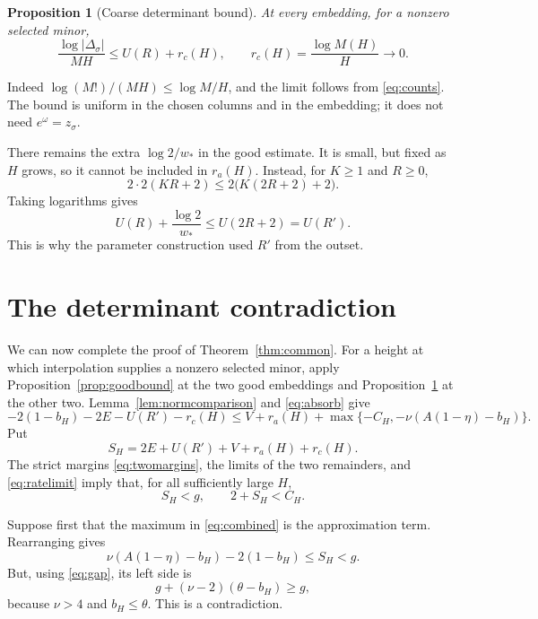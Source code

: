 \documentclass[11pt]{article}
\newtheorem{proposition}[theorem]{Proposition}
\theoremstyle{definition}
\theoremstyle{remark}
\theoremstyle{plain}
\begin{document}
\begin{proposition}[Coarse determinant bound]\label{prop:coarse}
At every embedding, for a nonzero selected minor,
\begin{equation}\label{eq:coarse}
 \frac{\log|\Delta_\sigma|}{MH}
 \le U(R)+r_c(H),\qquad r_c(H)=\frac{\log M(H)}H\longrightarrow0.
\end{equation}
\end{proposition}
Indeed \(\log(M!)/(MH)\le\log M/H\), and the limit follows from
\eqref{eq:counts}. The bound is uniform in the chosen columns and in the
embedding; it does not need \(e^\omega=z_\sigma\).

There remains the extra \(\log2/w_*\) in the good estimate. It is
small, but fixed as \(H\) grows, so it cannot be included in \(r_a(H)\).
Instead, for \(K\ge1\) and \(R\ge0\),
\[
 2\cdot2(KR+2)\le2\bigl(K(2R+2)+2\bigr).
\]
Taking logarithms gives
\begin{equation}\label{eq:absorb}
 U(R)+\frac{\log2}{w_*}\le U(2R+2)=U(R').
\end{equation}
This is why the parameter construction used \(R'\) from the outset.

\section{The determinant contradiction}\label{sec:contradiction}
We can now complete the proof of Theorem~\ref{thm:common}. For a height
at which interpolation supplies a nonzero selected minor, apply
Proposition~\ref{prop:goodbound} at the two good embeddings and
Proposition~\ref{prop:coarse} at the other two. Lemma~\ref{lem:normcomparison}
and \eqref{eq:absorb} give
\begin{equation}\label{eq:combined}
 -2(1-b_H)-2E-U(R')-r_c(H)
 \le V+r_a(H)+
             \max\{-C_H,-\nu(A(1-\eta)-b_H)\}.
\end{equation}
Put
\begin{equation}\label{eq:SH}
 S_H=2E+U(R')+V+r_a(H)+r_c(H).
\end{equation}
The strict margins \eqref{eq:twomargins}, the limits of the two
remainders, and \eqref{eq:ratelimit} imply that, for all sufficiently
large \(H\),
\begin{equation}\label{eq:eventualmargins}
 S_H<g,\qquad 2+S_H<C_H.
\end{equation}

Suppose first that the maximum in \eqref{eq:combined} is the
approximation term. Rearranging gives
\[
 \nu(A(1-\eta)-b_H)-2(1-b_H)\le S_H<g.
\]
But, using \eqref{eq:gap}, its left side is
\[
 g+(\nu-2)(\theta-b_H)\ge g,
\]
because \(\nu>4\) and \(b_H\le\theta\). This is a contradiction.
\end{document}
